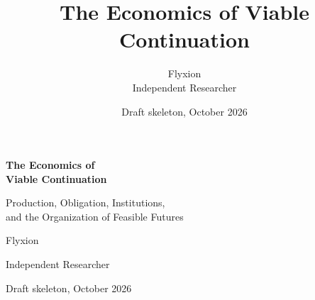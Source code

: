 \documentclass[11pt,twoside,openany]{book}
\title{The Economics of Viable Continuation}
\author{Flyxion\\Independent Researcher}
\date{Draft skeleton, October 2026}
\begin{document}
\frontmatter
\begin{titlepage}
\centering
\vspace*{1.2in}
{\Huge\bfseries The Economics of\\[0.3em] Viable Continuation\par}
\vspace{0.5in}
{\Large Production, Obligation, Institutions,\\and the Organization of Feasible Futures\par}
\vspace{1.0in}
{\Large Flyxion\par}
{\large Independent Researcher\par}
\vfill
{\large Draft skeleton, October 2026\par}
\end{titlepage}

\tableofcontents







\mainmatter













\appendix




\backmatter
\nocite{*}


\end{document}

